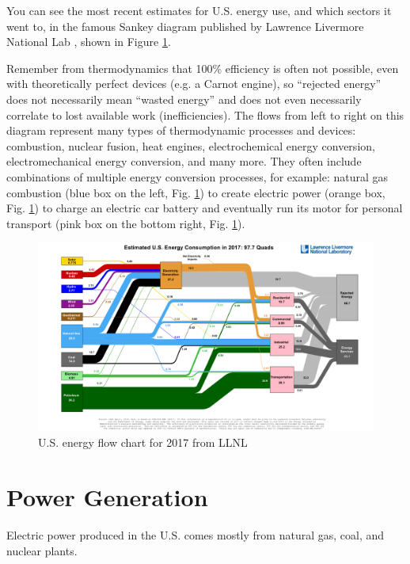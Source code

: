\documentclass[10pt]{article}
\begin{document}
You can see the most recent estimates for U.S. energy use, and which sectors it went to, in the famous Sankey diagram published by Lawrence Livermore National Lab \cite{noauthor_undated-zv}, shown in Figure \ref{sankey}. 

Remember from thermodynamics that 100\% efficiency is often not possible, even with theoretically perfect devices (e.g. a Carnot engine), so ``rejected energy'' does not necessarily mean ``wasted energy'' and does not even necessarily correlate to lost available work (inefficiencies). The flows from left to right on this diagram represent many types of thermodynamic processes and devices: combustion, nuclear fusion, heat engines, electrochemical energy conversion, electromechanical energy conversion, and many more. They often include combinations of multiple energy conversion processes, for example:  natural gas combustion (blue box on the left, Fig. \ref{sankey}) to create electric power (orange box, Fig. \ref{sankey}) to charge an electric car battery and eventually run its motor for personal transport (pink box on the bottom right, Fig. \ref{sankey}).

            \begin{figure}[h]
            \includegraphics[width=7in]{extras03/2017_United-States_Energy.pdf}
            \caption{U.S. energy flow chart for 2017 from LLNL \cite{noauthor_undated-zv}}
            \label{sankey}
            \end{figure}



\section{Power Generation}

Electric power produced in the U.S. comes mostly from natural gas, coal, and nuclear plants. 
\end{document}
